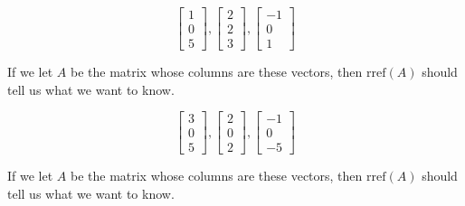 \documentclass{ximera}
\begin{document}
\begin{problem}\label{prob:linindmultchoice2}
$$\begin{bmatrix}1\\0\\5\end{bmatrix}, \begin{bmatrix}2\\2\\3\end{bmatrix},\begin{bmatrix}-1\\0\\1\end{bmatrix}$$

\begin{multipleChoice}
 \end{multipleChoice}
\begin{hint}
If we let $A$ be the matrix whose columns are these vectors, then $\mbox{rref}(A)$ should tell us what we want to know.
\end{hint}
\end{problem}

\begin{problem}\label{prob:linindmultchoice3}
$$\begin{bmatrix}3\\0\\5\end{bmatrix}, \begin{bmatrix}2\\0\\2\end{bmatrix},\begin{bmatrix}-1\\0\\-5\end{bmatrix}$$

\begin{multipleChoice}
 \end{multipleChoice}
 \begin{hint}
 If we let $A$ be the matrix whose columns are these vectors, then $\mbox{rref}(A)$ should tell us what we want to know.
 \end{hint}
\end{problem}
\end{document}
